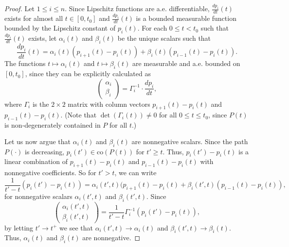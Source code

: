 \documentclass[11pt]{amsart}
\theoremstyle{remark}
\numberwithin{equation}{section}
\newcommand{\co}{\mathrm{co}}
\renewcommand{\leq}{\leqslant}
\renewcommand{\geq}{\geqslant}
\begin{document}
\begin{proof} 
Let $1\leq i\leq n$.
Since Lipschitz functions are a.e. differentiable,  $\frac{d p_i}{dt} (t)$ exists for almost all $t\in [0,t_0]$ and $\frac{d p_i}{dt}(t)$ is a bounded measurable function bounded by the Lipschitz constant of $p_i(t)$. 
For each  $0\leq t< t_0$ such that $\frac{d p_i}{dt}(t)$ exists, let   $\alpha_i(t)$ and $\beta_i(t)$ be the unique scalars such that
\begin{equation}\label{alphaibetai}
\frac{d p_i}{dt}(t)=\alpha_{i}(t)(p_{i+1}(t)-p_i(t))+\beta_i(t)(p_{i-1}(t)-p_i(t)).
\end{equation}
The functions $t\mapsto \alpha_i(t)$ and $t\mapsto \beta_i(t)$ are measurable and a.e. bounded on $[0,t_0]$, since they can be explicitly calculated as
\[
\begin{pmatrix}
\alpha_i\\
\beta_i\end{pmatrix}=\Gamma_i^{-1}
\cdot \frac{d p_i}{dt},
\]
where $\Gamma_i$ is the $2\times 2$ matrix  with column vectors  $p_{i+1}(t)-p_i(t)$ and $p_{i-1}(t)-p_i(t)$. 
(Note that $\det(\Gamma_i(t))\neq 0$ for all $0\leq t\leq t_0$, since $P(t)$ is non-degenerately contained in $P$ for all $t$.)

Let us now argue that $\alpha_i(t)$ and $\beta_i(t)$ are nonnegative scalars. Since the path $P(\cdot)$ is decreasing, $p_i(t')\in \co(P(t))$ for $t'\geq t$. Thus,  $p_{i}(t')-p_i(t)$ is a linear combination of   $p_{i+1}(t)-p_i(t)$ and $p_{i-1}(t)-p_i(t)$ with nonnegative coefficients. So for $t'>t$, we can write
\[
\frac{1}{t'-t}(p_{i}(t')-p_i(t))=\alpha_i(t',t)(p_{i+1}(t)-p_i(t)+\beta_i(t',t)(p_{i-1}(t)-p_i(t)),
\]
for nonnegative  scalars $\alpha_i(t',t)$ and $\beta_i(t',t)$. Since
\[
\begin{pmatrix}
\alpha_i(t',t)\\
\beta_i(t',t)\end{pmatrix}=\frac{1}{t'-t}\Gamma_i^{-1}(p_i(t')-p_i(t)),
\]
by letting $t'\to t^+$  we see that $\alpha_i(t',t)\to \alpha_i(t)$ and $\beta_i(t',t)\to \beta_i(t)$. Thus,
$\alpha_i(t)$ and $\beta_i(t)$ are nonnegative.
 

\end{proof}
\end{document}
